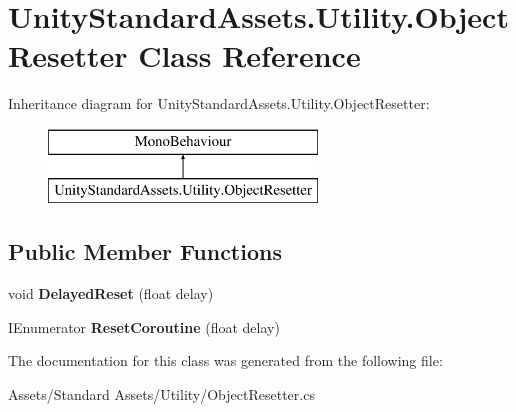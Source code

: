 \hypertarget{class_unity_standard_assets_1_1_utility_1_1_object_resetter}{}\section{Unity\+Standard\+Assets.\+Utility.\+Object\+Resetter Class Reference}
\label{class_unity_standard_assets_1_1_utility_1_1_object_resetter}
Inheritance diagram for Unity\+Standard\+Assets.\+Utility.\+Object\+Resetter\+:\begin{figure}[H]
\begin{center}
\leavevmode
\includegraphics[height=2.000000cm]{class_unity_standard_assets_1_1_utility_1_1_object_resetter}
\end{center}
\end{figure}
\subsection*{Public Member Functions}
\begin{DoxyCompactItemize}
\item 
void {\bfseries Delayed\+Reset} (float delay)\hypertarget{class_unity_standard_assets_1_1_utility_1_1_object_resetter_ab44d29e021b02f8bf2a65fdd9500669f}{}\label{class_unity_standard_assets_1_1_utility_1_1_object_resetter_ab44d29e021b02f8bf2a65fdd9500669f}

\item 
I\+Enumerator {\bfseries Reset\+Coroutine} (float delay)\hypertarget{class_unity_standard_assets_1_1_utility_1_1_object_resetter_a9f642e892d90f0720be3d1dbff5d8d93}{}\label{class_unity_standard_assets_1_1_utility_1_1_object_resetter_a9f642e892d90f0720be3d1dbff5d8d93}

\end{DoxyCompactItemize}


The documentation for this class was generated from the following file\+:\begin{DoxyCompactItemize}
\item 
Assets/\+Standard Assets/\+Utility/Object\+Resetter.\+cs\end{DoxyCompactItemize}

